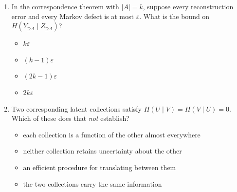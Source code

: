 \documentclass[11pt]{article}
\newcommand{\Up}{\mathord{\supseteq}}
\begin{document}
\begin{enumerate}
\item In the correspondence theorem with $|A|=k$, suppose every reconstruction
error and every Markov defect is at most $\varepsilon$. What is the bound on
$H(Y_{\Up A}\mid Z_{\Up A})$?
\begin{itemize}
\item $k\varepsilon$
\item $(k-1)\varepsilon$
\item $(2k-1)\varepsilon$
\item $2k\varepsilon$
\end{itemize}

\item Two corresponding latent collections satisfy $H(U\mid V)=H(V\mid U)=0$.
Which of these does that \emph{not} establish?
\begin{itemize}
\item each collection is a function of the other almost everywhere
\item neither collection retains uncertainty about the other
\item an efficient procedure for translating between them
\item the two collections carry the same information
\end{itemize}
\end{enumerate}
\end{document}
